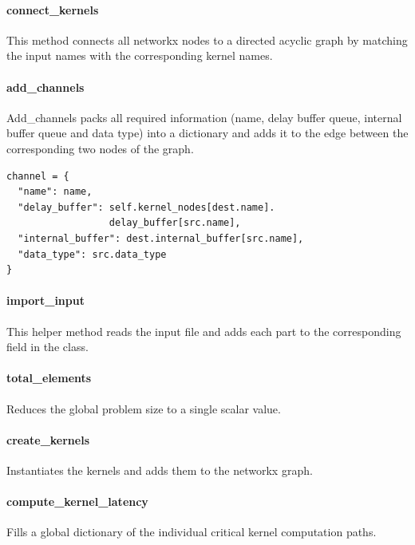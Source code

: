 \paragraph{connect\_kernels}
This method connects all networkx nodes to a directed acyclic graph by matching the input names with the corresponding kernel names.


\paragraph{add\_channels}
Add\_channels packs all required information (name, delay buffer queue, internal buffer queue and data type) into a dictionary and adds it to the edge between the corresponding two nodes of the graph.
\begin{verbatim}     
channel = {
  "name": name,
  "delay_buffer": self.kernel_nodes[dest.name].
                  delay_buffer[src.name],
  "internal_buffer": dest.internal_buffer[src.name],
  "data_type": src.data_type
}
\end{verbatim}


\paragraph{import\_input}
This helper method reads the input file and adds each part to the corresponding field in the class.


\paragraph{total\_elements}
Reduces the global problem size to a single scalar value.


\paragraph{create\_kernels}
Instantiates the kernels and adds them to the networkx graph.


\paragraph{compute\_kernel\_latency}
Fills a global dictionary of the individual critical kernel computation paths.


